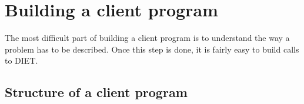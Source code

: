 
\chapter{Building a client program}
\label{ch:client}

The most difficult part of building a client program is to understand the way a
problem has to be described. Once this step is done, it is fairly easy to
build calls to DIET.


\section{Structure of a client program}
\label{sec:cl_struct}

